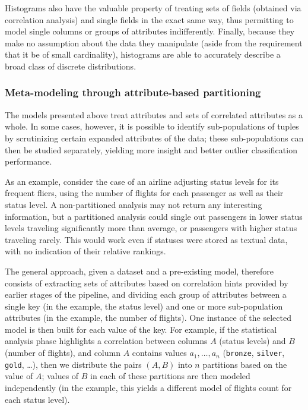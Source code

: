 Histograms also have the valuable property of treating sets of fields (obtained via correlation analysis) and single fields in the exact same way, thus permitting to model single columns or groups of attributes indifferently. Finally, because they make no assumption about the data they manipulate (aside from the requirement that it be of small cardinality), histograms are able to accurately describe a broad class of discrete distributions.

\subsubsection{Meta-modeling through attribute-based partitioning}
\label{sec:partitioning}

The models presented above treat attributes and sets of correlated attributes as a whole. In some cases, however, it is possible to identify sub-populations of tuples by scrutinizing certain expanded attributes of the data; these sub-populations can then be studied separately, yielding more insight and better outlier classification performance.

As an example, consider the case of an airline adjusting status levels for its frequent fliers, using the number of flights for each passenger as well as their status level. A non-partitioned analysis may not return any interesting information, but a partitioned analysis could single out passengers in lower status levels traveling significantly more than average, or passengers with higher status traveling rarely. This would work even if statuses were stored as textual data, with no indication of their relative rankings.

The general approach, given a dataset and a pre-existing model, therefore consists of extracting sets of attributes based on correlation hints provided by earlier stages of the pipeline, and dividing each group of attributes between a single key (in the example, the status level) and one or more sub-population attributes (in the example, the number of flights). One instance of the selected model is then built for each value of the key. For example, if the statistical analysis phase highlights a correlation between columns $A$ (status levels) and $B$ (number of flights), and column $A$ contains values $a_1, \dots, a_n$ (\texttt{bronze}, \texttt{silver}, \texttt{gold}, \dots), then we distribute the pairs $(A, B)$ into $n$ partitions based on the value of $A$; values of $B$ in each of these partitions are then modeled independently (in the example, this yields a different model of flights count for each status level).

